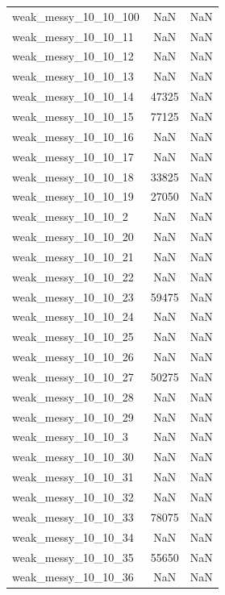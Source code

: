 \begin{longtable}{lcc}
weak\_messy\_10\_10\_100   &      NaN &    NaN \\
weak\_messy\_10\_10\_11    &      NaN &    NaN \\
weak\_messy\_10\_10\_12    &      NaN &    NaN \\
weak\_messy\_10\_10\_13    &      NaN &    NaN \\
weak\_messy\_10\_10\_14    &    47325 &    NaN \\
weak\_messy\_10\_10\_15    &    77125 &    NaN \\
weak\_messy\_10\_10\_16    &      NaN &    NaN \\
weak\_messy\_10\_10\_17    &      NaN &    NaN \\
weak\_messy\_10\_10\_18    &    33825 &    NaN \\
weak\_messy\_10\_10\_19    &    27050 &    NaN \\
weak\_messy\_10\_10\_2     &      NaN &    NaN \\
weak\_messy\_10\_10\_20    &      NaN &    NaN \\
weak\_messy\_10\_10\_21    &      NaN &    NaN \\
weak\_messy\_10\_10\_22    &      NaN &    NaN \\
weak\_messy\_10\_10\_23    &    59475 &    NaN \\
weak\_messy\_10\_10\_24    &      NaN &    NaN \\
weak\_messy\_10\_10\_25    &      NaN &    NaN \\
weak\_messy\_10\_10\_26    &      NaN &    NaN \\
weak\_messy\_10\_10\_27    &    50275 &    NaN \\
weak\_messy\_10\_10\_28    &      NaN &    NaN \\
weak\_messy\_10\_10\_29    &      NaN &    NaN \\
weak\_messy\_10\_10\_3     &      NaN &    NaN \\
weak\_messy\_10\_10\_30    &      NaN &    NaN \\
weak\_messy\_10\_10\_31    &      NaN &    NaN \\
weak\_messy\_10\_10\_32    &      NaN &    NaN \\
weak\_messy\_10\_10\_33    &    78075 &    NaN \\
weak\_messy\_10\_10\_34    &      NaN &    NaN \\
weak\_messy\_10\_10\_35    &    55650 &    NaN \\
weak\_messy\_10\_10\_36    &      NaN &    NaN \\

\end{longtable}
